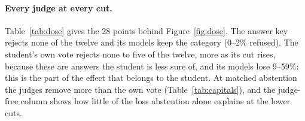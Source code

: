 \documentclass[11pt,a4paper,twocolumn]{article}
\begin{document}
\begin{table}[t]
\small
\centering
{}
\caption{The former-state blind spot at each operating point: refusal gap (former minus present-day) of the judge's models beyond models trained with the key plus random rejections at matched abstention. Two to six runs per cell.}
\label{tab:ladder}
\end{table}

\paragraph{Every judge at every cut.} Table~\ref{tab:dose} gives the 28 points behind Figure~\ref{fig:dose}. The answer key rejects none of the twelve and its models keep the category (0--2\% refused). The student's own vote rejects none to five of the twelve, more as its cut rises, because these are answers the student is less sure of, and its models lose 9--59\%: this is the part of the effect that belongs to the student. At matched abstention the judges remove more than the own vote (Table~\ref{tab:capitals}), and the judge-free column shows how little of the loss abstention alone explains at the lower cuts.
\end{document}
